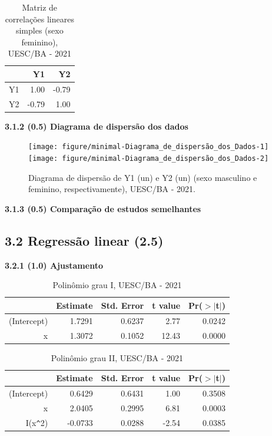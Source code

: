 \documentclass[12pt]{article}\usepackage[]{graphicx}\usepackage[]{color}
\newenvironment{knitrout}{}{} %
\begin{document}
\begin{table}[!ht]
  \centering
  \caption{Matriz de correlações lineares simples (sexo feminino), UESC/BA - 2021}
  \begin{tabular}{rrr}
   \hline
  & Y1 & Y2\\ 
  \hline
  Y1 & 1.00 & -0.79 \\ 
  Y2 & -0.79 & 1.00 \\ 
  \hline
  \end{tabular}
\end{table}
  \textbf{3.1.2 (0.5) Diagrama de dispersão dos dados}
\begin{figure}[!h]
\label{figura:Diagrama de dispersão}
\begin{knitrout}
\color{fgcolor}

{\centering \texttt{[image: figure/minimal-Diagrama\_de\_dispersão\_dos\_Dados-1]} 
\texttt{[image: figure/minimal-Diagrama\_de\_dispersão\_dos\_Dados-2]} 

}


\end{knitrout}
\caption{Diagrama de dispersão de Y1 (un) e Y2 (un) (sexo masculino e feminino, respectivamente), UESC/BA - 2021.}
\end{figure}

  
  \textbf{3.1.3 (0.5) Comparação de estudos semelhantes}

\subsection{3.2 Regressão linear (2.5)}

  \textbf{3.2.1 (1.0) Ajustamento}


\begin{table}[!ht]
\centering
\caption{Polinômio grau I, UESC/BA - 2021}
\begin{tabular}{rrrrr}
  \hline
 & Estimate & Std. Error & t value & Pr($>$$|$t$|$) \\ 
  \hline
(Intercept) & 1.7291 & 0.6237 & 2.77 & 0.0242 \\ 
  x & 1.3072 & 0.1052 & 12.43 & 0.0000 \\ 
   \hline
\end{tabular}
\end{table}

\begin{table}[!ht]
\centering
\caption{Polinômio grau II, UESC/BA - 2021}
\begin{tabular}{rrrrr}
  \hline
 & Estimate & Std. Error & t value & Pr($>$$|$t$|$) \\ 
  \hline
(Intercept) & 0.6429 & 0.6431 & 1.00 & 0.3508 \\ 
  x & 2.0405 & 0.2995 & 6.81 & 0.0003 \\ 
  I(x\verb|^|2) & -0.0733 & 0.0288 & -2.54 & 0.0385 \\ 
   \hline 
   \hline
\end{tabular}
\end{table}
\end{document}
